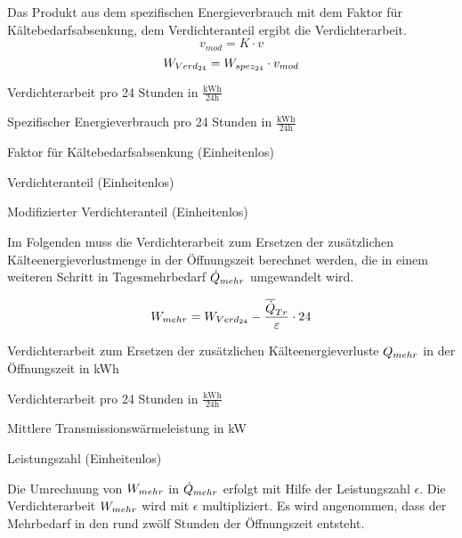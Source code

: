 Das Produkt aus dem spezifischen Energieverbrauch mit dem Faktor für
Kältebedarfsabsenkung, dem Verdichteranteil ergibt die Verdichterarbeit.
\begin{equation}
	v_{mod} = K \cdot v
\label{vmod}
\end{equation}
\begin{equation}
	\lverd = \lspez \cdot v_{mod}
\label{lverd}
\end{equation}

\begin{description}[\dth]

	\item[$\lverd$] Verdichterarbeit pro 24 Stunden in
	$\mathrm{\frac{kWh}{24h}}$
	\item[$\lspez$] Spezifischer Energieverbrauch pro 24 Stunden in
		$\mathrm{\frac{kWh}{24h}}$
	\item[$K$] Faktor für Kältebedarfsabsenkung (Einheitenlos)
	\item[$v$] Verdichteranteil (Einheitenlos)
	\item[$v_{mod}$] Modifizierter Verdichteranteil (Einheitenlos)

\end{description}
\vspace{0.5cm}

Im Folgenden muss die Verdichterarbeit zum Ersetzen der zus\"atzlichen
K\"alteenergieverlustmenge in der \"Offnungszeit berechnet werden, die in einem
weiteren Schritt in Tagesmehrbedarf $\dot{Q}_{mehr}$ umgewandelt wird.

\begin{equation}
	\lmehr = \lverd - \frac{\aptrans}{\epsilon} \cdot 24
\label{lmehr}
\end{equation}

\begin{description}[\dth]

	\item[$\lmehr$] Verdichterarbeit zum Ersetzen der zus\"atzlichen
	K\"alteenergieverluste $Q_{mehr}$ in der \"Offnungszeit in kWh
	\item[$\lverd$] Verdichterarbeit pro 24 Stunden in
	$\mathrm{\frac{kWh}{24h}}$
	\item[$\aptrans$] Mittlere Transmissionswärmeleistung in kW
	\item[$\epsilon$] Leistungszahl (Einheitenlos)

\end{description}
\vspace{0.5cm}

Die Umrechnung von $\lmehr$ in $\dot{Q}_{mehr}$ erfolgt mit Hilfe der Leistungszahl
$\epsilon$. Die Verdichterarbeit $\lmehr$ wird mit $\epsilon$ multipliziert.
Es wird angenommen, dass der Mehrbedarf in den rund zw\"olf Stunden der
\"Offnungszeit entsteht.

